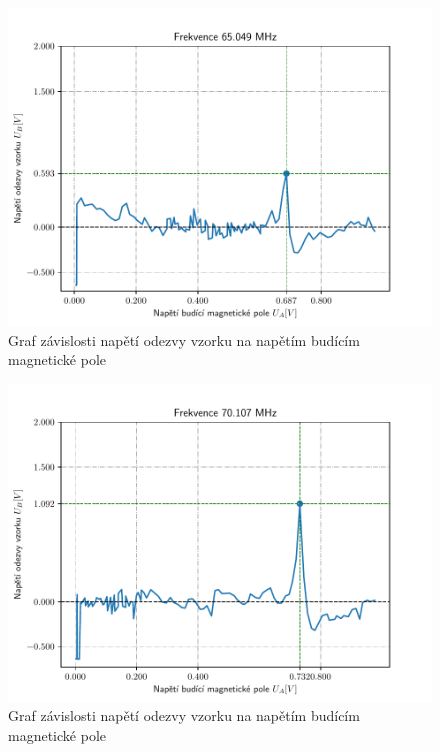 \documentclass{article}
\begin{document}
\begin{figure}[!h]
  \hspace*{-10em}
  \includegraphics[scale=1.2]{figs/5.pdf}
  \caption{Graf závislosti napětí odezvy vzorku na napětím budícím magnetické pole}
\end{figure}
\clearpage
\begin{figure}[!h]
  \hspace*{-10em}
  \includegraphics[scale=1.2]{figs/6.pdf}
  \caption{Graf závislosti napětí odezvy vzorku na napětím budícím magnetické pole}
\end{figure}
\clearpage
\end{document}
